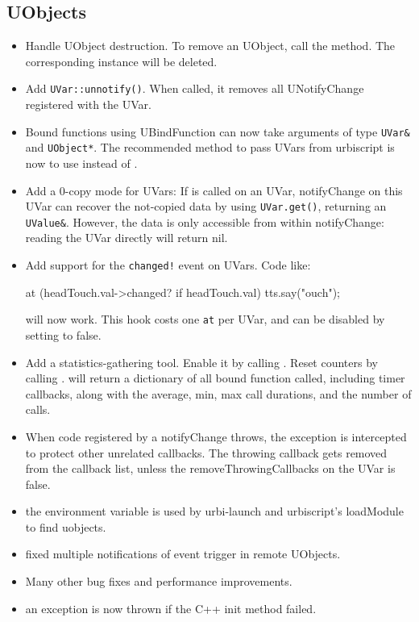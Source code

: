 \subsection{UObjects}
\begin{itemize}
\item Handle UObject destruction. To remove an UObject, call the \us
   method. The corresponding \Cxx instance will be deleted.

\item Add \lstinline|UVar::unnotify()|. When called, it removes all
  UNotifyChange registered with the UVar.

\item Bound functions using UBindFunction can now take arguments of type
  \lstinline|UVar&| and \lstinline|UObject*|. The recommended method to pass
  UVars from urbiscript is now to use  instead
  of .

\item Add a 0-copy mode for UVars: If  is
  called on an UVar, notifyChange on this UVar can recover the not-copied
  data by using \lstinline|UVar.get()|, returning an
  \lstinline|UValue&|. However, the data is only accessible from within
  notifyChange: reading the UVar directly will return nil.

\item Add support for the \lstinline|changed!| event on UVars. Code like:

\begin{urbiunchecked}
at (headTouch.val->changed? if headTouch.val)
  tts.say("ouch");
\end{urbiunchecked}
  \noindent
  will now work. This hook costs one \lstinline|at| per UVar, and can be
  disabled by setting  to false.

\item Add a statistics-gathering tool. Enable it by calling
  . Reset counters by calling
  .  will return a
  dictionary of all bound \Cxx function called, including timer callbacks,
  along with the average, min, max call durations, and the number of calls.

\item When code registered by a notifyChange throws, the exception is
  intercepted to protect other unrelated callbacks. The throwing
  callback gets removed from the callback list, unless the
  removeThrowingCallbacks on the UVar is false.

\item the environment variable  is used by
  urbi-launch and urbiscript's loadModule to find uobjects.

\item fixed multiple notifications of event trigger in remote UObjects.

\item Many other bug fixes and performance improvements.

\item an exception is now thrown if the C++ init method failed.
\end{itemize}



